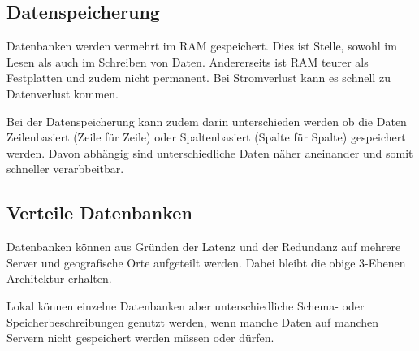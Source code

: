 \documentclass{article}
\begin{document}
\subsection{Datenspeicherung}
Datenbanken werden vermehrt im RAM gespeichert. Dies ist Stelle, sowohl im Lesen als auch im Schreiben von Daten. Andererseits ist RAM teurer als Festplatten und zudem nicht permanent. Bei Stromverlust kann es schnell zu Datenverlust kommen.

Bei der Datenspeicherung kann zudem darin unterschieden werden ob die Daten Zeilenbasiert (Zeile für Zeile) oder Spaltenbasiert (Spalte für Spalte) gespeichert werden. Davon abhängig sind unterschiedliche Daten näher aneinander und somit schneller verarbbeitbar.

\subsection{Verteile Datenbanken}
Datenbanken können aus Gründen der Latenz und der Redundanz auf mehrere Server und geografische Orte aufgeteilt werden. Dabei bleibt die obige 3-Ebenen Architektur erhalten.

Lokal können einzelne Datenbanken aber unterschiedliche Schema- oder Speicherbeschreibungen genutzt werden, \zb wenn manche Daten auf manchen Servern nicht gespeichert werden müssen oder dürfen.
\end{document}

